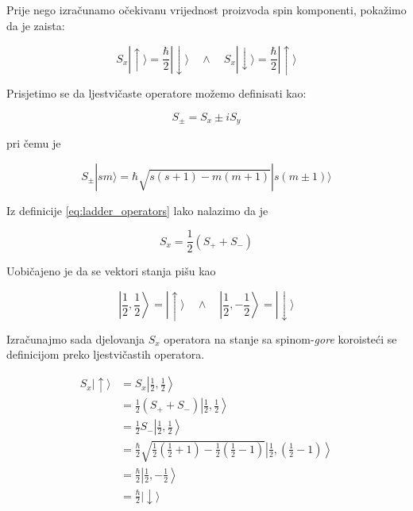 Prije nego izračunamo očekivanu vrijednost proizvoda spin komponenti, pokažimo da je zaista:

\begin{equation*}
    S_x|\uparrow\rangle = \frac{\hbar}{2}|\downarrow\rangle \quad \land \quad S_x|\downarrow\rangle = \frac{\hbar}{2}|\uparrow\rangle
\end{equation*}

Prisjetimo se da ljestvičaste operatore možemo definisati kao:

\begin{equation}
    S_{\pm} = S_x \pm i S_y \tag*{*} \label{eq:ladder_operators}
\end{equation}

pri čemu je

\begin{equation*}
    S_{\pm}|sm \rangle = \hbar\sqrt{s(s+1)-m(m+1)}|s(m\pm 1) \rangle
\end{equation*}

Iz definicije \eqref{eq:ladder_operators} lako nalazimo da je

\begin{equation*}
    S_x = \frac{1}{2}(S_+ + S_-)
\end{equation*}

\newpage

Uobičajeno je da se vektori stanja pišu kao

\begin{equation*}
    \left |\frac{1}{2},\frac{1}{2} \right \rangle = |\uparrow \rangle \quad \land \quad \left |\frac{1}{2},-\frac{1}{2} \right \rangle = |\downarrow \rangle
\end{equation*}

Izračunajmo sada djelovanja $S_x$ operatora na stanje sa spinom-\textit{gore} koroisteći se definicijom preko ljestvičastih operatora.

\begin{equation*}
    \begin{aligned}
S_x | \uparrow \rangle &= S_x \left |\frac{1}{2},\frac{1}{2} \right \rangle \\[1ex]
        &= \frac{1}{2}(S_+ + S_-) \left |\frac{1}{2},\frac{1}{2} \right \rangle \\[1ex]
        &= \frac{1}{2} S_- \left |\frac{1}{2},\frac{1}{2} \right \rangle \\[1ex]
        &= \frac{\hbar}{2}\sqrt{\frac{1}{2}\left (\frac{1}{2}+1 \right )-\frac{1}{2}\left (\frac{1}{2}-1 \right )} \left |\frac{1}{2} , \left (\frac{1}{2} - 1 \right ) \right \rangle \\[1ex]
        &= \frac{\hbar}{2} \left |\frac{1}{2},-\frac{1}{2} \right \rangle \\[1ex]
        &= \frac{\hbar}{2} | \downarrow \rangle
    \end{aligned}
\end{equation*}


